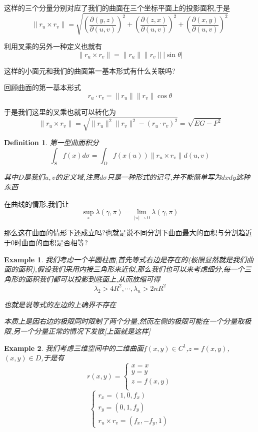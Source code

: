 \documentclass[11pt,hyperref,a4paper,UTF8]{ctexart}
\newtheorem{example}{Example}[subsection]
\newtheorem{definition}{Definition}[subsection]
\newcommand{\parameter}[1]{\left(#1\right)}
\begin{document}
\begin{CJK}{UTF8}{gkai}
这样的三个分量分别对应了我们的曲面在三个坐标平面上的投影面积,于是
\[\|r_u \times r_v\| = \sqrt{\parameter{\frac{\partial(y,z)}{\partial(u,v)}}^2 + \parameter{\frac{\partial(z,x)}{\partial(u,v)}}^2 + \parameter{\frac{\partial(x,y)}{\partial(u,v)}}^2}\]

利用叉乘的另外一种定义也就有
\[\|r_u \times r_v\| = \|r_u\| \|r_v\| |\sin \theta| \]

这样的小面元和我们的曲面第一基本形式有什么关联吗?

回顾曲面的第一基本形式
\[r_u \cdot r_v = \|r_u\| \| r_v\| \cos \theta\]

于是我们这里的叉乘也就可以转化为
\[\|r_u \times r_v\| = \sqrt{\|r_u\|^2 \|r_v\|^2 - (r_u \cdot r_v)^2} = \sqrt{E G - F^2}\]

\begin{definition}
  第一型曲面积分\\

  \[\int_{S} f(x) d\sigma = \int_{D} f(x(u)) \|r_u \times r_v\| d(u,v)\]

  其中$D$是我们$u,v$的定义域,注意$d\sigma$只是一种形式的记号,并不能简单写为$dxdy$这种东西
\end{definition}

在曲线的情形,我们让
\[\sup_\pi \lambda(\gamma,\pi) = \lim_{|\pi| \to 0} \lambda(\gamma,\pi)\]

那么这在曲面的情形下还成立吗?也就是说不同分割下曲面最大的面积与分割趋近于$0$时曲面的面积是否相等?

\begin{example}
  我们考虑一个半圆柱面,首先等式右边是存在的(极限显然就是我们曲面的面积),假设我们采用内接三角形来近似,那么我们也可以来考虑细分,每一个三角形的面积我们都可以投影到底面上,从而放缩可得
  \[\lambda_2 > 4 R^2 ,\cdots, \lambda_n > 2n R^2\]

  也就是说等式的左边的上确界不存在

  本质上是因右边的极限同时限制了两个分量,然而左侧的极限可能在一个分量取极限,另一个分量正常的情况下发散[上面就是这样]\\
\end{example}

\begin{example}
  我们考虑三维空间中的二维曲面$f(x,y) \in C^1$,$z = f(x,y)$,$(x,y) \in D$,于是有
  \[r(x,y) = \begin{cases}
    x = x\\
    y = y\\
    z = f(x,y)\\
  \end{cases}\]
  \[\begin{cases}
    r_x = (1,0,f_x)\\
    r_y = (0,1,f_y)\\
    r_u \times r_v = (f_x,-f_y,1)
  \end{cases}\]
  

\end{example}
\end{CJK}
\end{document}
